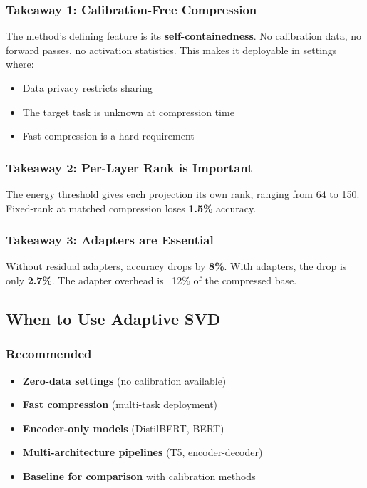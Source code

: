 \subsubsection{Takeaway 1: Calibration-Free Compression}

The method's defining feature is its \textbf{self-containedness}. No calibration 
data, no forward passes, no activation statistics. This makes it deployable 
in settings where:
\begin{itemize}
\item Data privacy restricts sharing
\item The target task is unknown at compression time
\item Fast compression is a hard requirement

\end{itemize}
\subsubsection{Takeaway 2: Per-Layer Rank is Important}

The energy threshold gives each projection its own rank, ranging from 
64 to 150. Fixed-rank at matched compression loses 
\textbf{1.5\%} accuracy.

\subsubsection{Takeaway 3: Adapters are Essential}

Without residual adapters, accuracy drops by \textbf{8\%}. With 
adapters, the drop is only \textbf{2.7\%}. The adapter overhead is 
~12\% of the compressed base.

\subsection{When to Use Adaptive SVD}

\subsubsection{Recommended}

\begin{itemize}
\item \textbf{Zero-data settings} (no calibration available)
\item \textbf{Fast compression} (multi-task deployment)
\item \textbf{Encoder-only models} (DistilBERT, BERT)
\item \textbf{Multi-architecture pipelines} (T5, encoder-decoder)
\item \textbf{Baseline for comparison} with calibration methods

\end{itemize}
